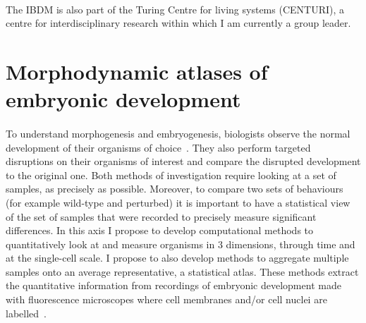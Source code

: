 \paragraph{}The IBDM is also part of the Turing Centre for living systems (CENTURI), a centre for interdisciplinary research within which I am currently a group leader.


\section{Morphodynamic atlases of embryonic development}\label{sec:morphodynamic}
\paragraph{}To understand morphogenesis and embryogenesis, biologists observe the normal development of their organisms of choice~\cite{Wallingford2019}.
They also perform targeted disruptions on their organisms of interest and compare the disrupted development to the original one.
Both methods of investigation require looking at a set of samples, as precisely as possible.
Moreover, to compare two sets of behaviours (for example wild-type and perturbed) it is important to have a statistical view of the set of samples that were recorded to precisely measure significant differences.
In this axis I propose to develop computational methods to quantitatively look at and measure organisms in 3 dimensions, through time and at the single-cell scale.
I propose to also develop methods to aggregate multiple samples onto an average representative, a statistical atlas.
These methods extract the quantitative information from recordings of embryonic development made with fluorescence microscopes where cell membranes and/or cell nuclei are labelled~\cite{Huisken2004,Keller2008,Krzic2012,Medeiros2015}.
